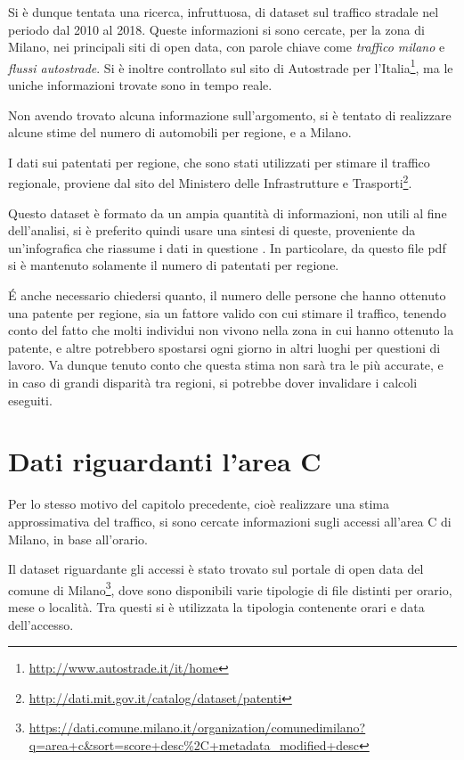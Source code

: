 \documentclass[a4paper,12pt]{report}
\newcommand{\quotestyle}[1]{\textit{#1}}
\begin{document}
Si è dunque tentata una ricerca, infruttuosa, di dataset sul traffico stradale nel periodo 
dal 2010 al 2018.
Queste informazioni si sono cercate, per la zona di Milano, nei principali 
siti di open data, con parole chiave come \quotestyle{traffico milano} e 
\quotestyle{flussi autostrade}. 
Si è inoltre controllato sul sito di Autostrade per 
l'Italia\footnote{\url{http://www.autostrade.it/it/home}}, 
ma le uniche informazioni trovate sono in tempo reale.

Non avendo trovato alcuna informazione sull'argomento, si è tentato di realizzare 
alcune stime del numero di automobili per regione, e a Milano.

I dati sui patentati per regione, che sono stati utilizzati per stimare il traffico 
regionale, proviene dal sito del Ministero delle Infrastrutture e 
Trasporti\footnote{\url{http://dati.mit.gov.it/catalog/dataset/patenti}}. 

Questo dataset è formato da un ampia quantità di informazioni, 
non utili al fine dell'analisi, 
si è preferito quindi usare una sintesi di queste, proveniente da 
un'infografica che riassume i dati in questione \cite{INFOGRAFICA_MIT:1}.
In particolare, da questo file pdf si è mantenuto solamente 
il numero di patentati per regione.

\'E anche necessario chiedersi quanto, il numero delle persone che hanno ottenuto 
una patente per regione, sia un fattore valido con cui stimare il traffico, 
tenendo conto del fatto che molti individui non vivono nella zona 
in cui hanno ottenuto la patente, e altre potrebbero spostarsi ogni giorno in altri 
luoghi per questioni di lavoro. 
Va dunque tenuto conto che questa stima non sarà tra le più accurate, 
e in caso di grandi disparità tra regioni, si potrebbe dover invalidare 
i calcoli eseguiti.

\section{Dati riguardanti l'area C}

Per lo stesso motivo del capitolo precedente, cioè realizzare una stima approssimativa 
del traffico, si sono cercate informazioni sugli accessi all'area C di Milano, 
in base all'orario.

Il dataset riguardante gli accessi è stato trovato sul portale di open data 
del comune di 
Milano\footnote{\url{https://dati.comune.milano.it/organization/comunedimilano?q=area+c&sort=score+desc\%2C+metadata_modified+desc}}, 
dove sono disponibili varie tipologie di file distinti per orario, 
mese o località. 
Tra questi si è utilizzata la tipologia contenente orari e data dell'accesso.
\end{document}
